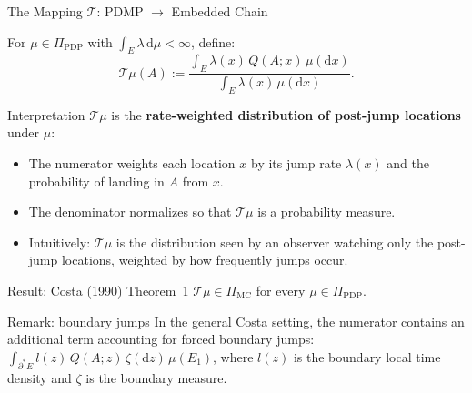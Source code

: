 \begin{frame}{The Mapping $\mathcal{T}$: PDMP $\to$ Embedded Chain}

  \begin{definition}
    For $\mu \in \Pi_{\mathrm{PDP}}$ with $\int_E \lambda\,\mathrm{d}\mu
    < \infty$, define:
    \[
      \mathcal{T}\mu(A) :=
      \frac{\displaystyle\int_E \lambda(x)\,Q(A;x)\,\mu(\mathrm{d}x)}
           {\displaystyle\int_E \lambda(x)\,\mu(\mathrm{d}x)}.
    \]
  \end{definition}

  \bigskip
  \begin{block}{Interpretation}
    $\mathcal{T}\mu$ is the \textbf{rate-weighted distribution of
    post-jump locations} under $\mu$:
    \begin{itemize}
      \setlength\itemsep{4pt}
      \item The numerator weights each location $x$ by its jump
            rate $\lambda(x)$ and the probability of landing in $A$
            from $x$.
      \item The denominator normalizes so that $\mathcal{T}\mu$ is
            a probability measure.
      \item Intuitively: $\mathcal{T}\mu$ is the distribution seen
            by an observer watching only the post-jump locations,
            weighted by how frequently jumps occur.
    \end{itemize}
  \end{block}

  \bigskip
  \begin{block}{Result: Costa (1990) Theorem~1}
    $\mathcal{T}\mu \in \Pi_{\mathrm{MC}}$ for every
    $\mu \in \Pi_{\mathrm{PDP}}$.
  \end{block}

  \bigskip
  \begin{block}{Remark: boundary jumps}
    In the general Costa setting, the numerator contains an
    additional term accounting for forced boundary jumps:
    $\int_{\partial^* E} l(z)\,Q(A;z)\,\zeta(\mathrm{d}z)\,\mu(E_1)$,
    where $l(z)$ is the boundary local time density and $\zeta$
    is the boundary measure.
  \end{block}

\end{frame}

